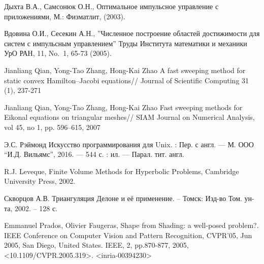 \begin{thebibliography}{99}
 Дыхта В.А., Самсонюк О.Н., Оптимальное импульсное управление с приложениями, М.: Физматлит, (2003).

 Вдовина О.И., Сесекин А.Н., ''Численное построение областей достижимости для систем с импульсным управлением'' Труды Института математики и механики УрО РАН, 11, No.~1, 65-73 (2005).

  
 {Jianliang Qian, Yong-Tao Zhang, Hong-Kai Zhao} A
  fast sweeping method for static convex Hamilton–Jacobi equations//
  Journal of Scientific Computing 31 (1), 237-271
  
 {Jianliang Qian, Yong-Tao Zhang, Hong-Kai Zhao} Fast
  sweeping methods for Eikonal equations on triangular meshes// SIAM
  Journal on Numerical Analysis, vol 45, no 1, pp. 596–615, 2007

 {Э.С. Рэймонд} Искусство программирования для Unix. :
  Пер. с англ. --- М. ООО ``И.Д. Вильямс'', 2016. --- 544 с. : ил. ---
  Парал. тит. англ.
  
 {R.J. Leveque}, Finite Volume Methods for Hyperbolic Problems, Cambridge
University Press, 2002.

 {Скворцов А.В.} Триангуляция Делоне и её применение. –
  Томск: Изд-во Том. ун-та, 2002. – 128 с.

 {Emmanuel Prados, Olivier Faugeras}, Shape from Shading: a well-posed problem?. IEEE Conference
on Computer Vision and Pattern Recognition, CVPR’05, Jun 2005, San Diego, United States. IEEE,
2, pp.870-877, 2005, <10.1109/CVPR.2005.319>. <inria-00394230>

  
\end{thebibliography}


